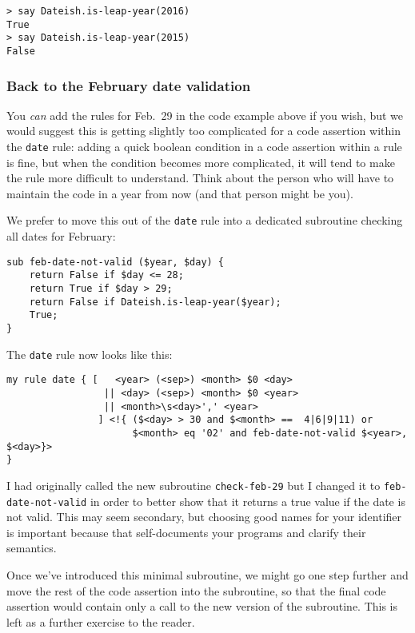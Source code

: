 \begin{verbatim}
> say Dateish.is-leap-year(2016)
True
> say Dateish.is-leap-year(2015)
False
\end{verbatim}

\subsubsection{Back to the February date validation}

You \emph{can} add the rules for Feb.~29 in the code example 
above if you wish, but we would suggest this is getting 
slightly too complicated for a code assertion within 
the {\tt date} rule: adding a quick boolean condition 
in a code assertion within a rule is fine, but when 
the condition becomes more complicated, it will tend 
to make the rule more difficult to understand. Think 
about the person who will have to maintain the code in 
a year from now (and that person might be you).
 
We prefer to move this out of the {\tt date} rule into 
a dedicated subroutine checking all dates for February:

\begin{verbatim}
sub feb-date-not-valid ($year, $day) {
    return False if $day <= 28;
    return True if $day > 29;
    return False if Dateish.is-leap-year($year);
    True;
}
\end{verbatim}

The {\tt date} rule now looks like this:

\begin{verbatim}
my rule date { [   <year> (<sep>) <month> $0 <day> 
                 || <day> (<sep>) <month> $0 <year> 
                 || <month>\s<day>',' <year>
                ] <!{ ($<day> > 30 and $<month> ==  4|6|9|11) or 
                      $<month> eq '02' and feb-date-not-valid $<year>, $<day>}>
} 
\end{verbatim}

I had originally called the new subroutine {\tt check-feb-29} 
but I changed it to {\tt feb-date-not-valid} in order to 
better show that it returns a true value if the date 
is not valid. This may seem secondary, but choosing good 
names for your identifier is important because that 
self-documents your programs and clarify their semantics.

Once we've introduced this minimal subroutine, we 
might go one step further and move the rest of the 
code assertion into the subroutine, so that the final code 
assertion would contain only a call to the new version 
of the subroutine. This is left as a further exercise 
to the reader.

